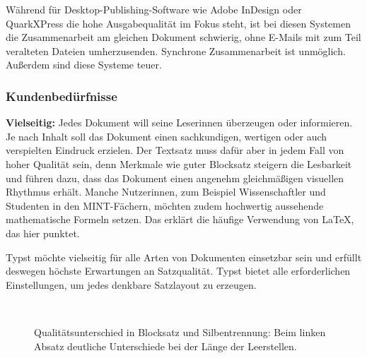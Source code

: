 \documentclass[11pt, a4paper]{article}
\newcommand{\gender}{\raisebox{-.25em}{*}}
\renewcommand{\glossary} {\marginsymbol{\textbf{↪}}}
\newcommand{\marginsymbol}[1] {\protect\marginsymbolhelper{#1}}
\newcommand{\marginsymbolhelper}[1] {\tabto*{-1cm}\makebox[0cm]{#1}\tabto*{\TabPrevPos}}
\begin{document}
Während für Desktop-Publishing-Software wie Adobe InDesign oder QuarkXPress die hohe Ausgabequalität im Fokus steht, ist bei diesen Systemen die Zusammenarbeit am gleichen Dokument schwierig, ohne E-Mails mit zum Teil veralteten Dateien umherzusenden. Synchrone Zusammenarbeit ist unmöglich. Außerdem sind diese Systeme teuer.

\subsubsection*{Kundenbedürfnisse}


\textbf{Vielseitig:} Jedes Dokument will seine Leser\gender{}innen überzeugen oder informieren. Je nach Inhalt soll das Dokument einen sachkundigen, wertigen oder auch verspielten Eindruck erzielen. Der Textsatz muss dafür aber in jedem Fall von hoher Qualität sein, denn Merkmale wie guter \glossary Blocksatz steigern die Lesbarkeit und führen dazu, dass das Dokument einen angenehm gleichmäßigen visuellen Rhythmus erhält. Manche Nutzer\gender{}innen, zum Beispiel Wissenschaftler und Studenten in den \glossary MINT-Fächern, möchten zudem hochwertig aussehende mathematische Formeln setzen. Das erklärt die häufige Verwendung von LaTeX, das hier punktet.

Typst möchte vielseitig für alle Arten von Dokumenten einsetzbar sein und erfüllt deswegen höchste Erwartungen an Satzqualität. Typst bietet alle erforderlichen Einstellungen, um jedes denkbare Satzlayout zu erzeugen.

\begin{figure}
    \centering
    ~ %
    \caption{Qualitätsunterschied in Blocksatz und Silbentrennung: 
  Beim linken Absatz deutliche Unterschiede bei der Länge der Leerstellen.}
\end{figure}
\end{document}
